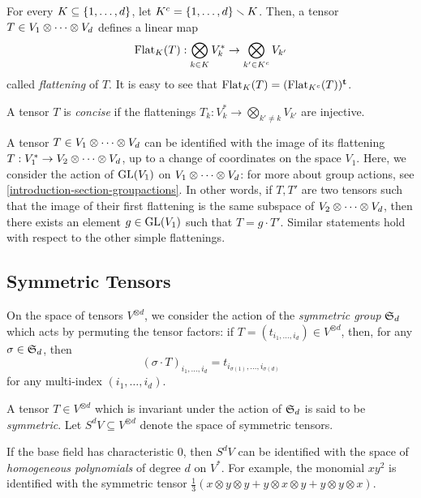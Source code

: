 \begin{definition}[Flattenings]\label{introduction-definition-flattenings}
For every $K \subseteq \{1 , \ldots , d\}$, let $K^c = \{1, \ldots , d\} \smallsetminus K$. Then, a tensor $T \in V_1 \otimes \cdots \otimes V_d$ defines a linear map 
\[
    \mathrm{Flat}_K(T): \bigotimes_{k \in K} V_{k}^* \to  \bigotimes_{k' \in K^c} V_{k'}
\]
called \emph{flattening} of $T$. It is easy to see that $\mathrm{Flat}_K(T) = (\mathrm{Flat}_{K^c}(T))^{\mathbf{t}}$. 
\end{definition}

\begin{definition}\label{introduction-definition-concise}
    A tensor $T$ is \emph{concise} if the flattenings $T_k : V_k^* \to \bigotimes_{k' \neq k} V_{k'}$ are injective. 
\end{definition}

A tensor $T \in V_1 \otimes \cdots \otimes V_d$ can be identified with the image of its flattening $T : V_1^* \to V_2 \otimes \cdots \otimes V_d$, up to a change of coordinates on the space $V_1$. Here, we consider the action of $\mathrm{GL}(V_1)$ on $V_1 \otimes \cdots \otimes V_d$: for more about group actions, see \ref{introduction-section-groupactions}. In other words, if $T,T'$ are two tensors such that the image of their first flattening is the same subspace of $V_2 \otimes \cdots \otimes V_d$, then there exists an element $g \in \mathrm{GL}(V_1)$ such that $T = g\cdot T'$. Similar statements hold with respect to the other simple flattenings.

\subsection{Symmetric Tensors}
\label{introduction-subsection-symmetric_tensors}

On the space of tensors $V^{\otimes d}$, we consider the action of the \emph{symmetric group} $\mathfrak{S}_d$ which acts by permuting the tensor factors: if $T = (t_{i_1,\ldots,i_d}) \in V^{\otimes d}$, then, for any $\sigma \in \mathfrak{S}_d$, then \[(\sigma \cdot T)_{i_1,\ldots,i_d} = t_{i_{\sigma(1)},\ldots,i_{\sigma(d)}}\] for any multi-index $(i_1,\ldots,i_d)$. 
\begin{definition}
    \label{introduction-definition-symmetric_tensors}

    A tensor $T \in V^{\otimes d}$ which is invariant under the action of $\mathfrak{S}_d$ is said to be \emph{symmetric}. Let $S^d V \subseteq V^{\otimes d}$ denote the space of symmetric tensors. 

    If the base field has characteristic $0$, then $S^d V$ can be identified with the space of \emph{homogeneous polynomials} of degree $d$ on $V^*$. For example, the monomial $xy^2$ is identified with the symmetric tensor $\frac{1}{3}\left(x\otimes y \otimes y + y\otimes x \otimes y + y\otimes y \otimes x\right)$.
\end{definition}


